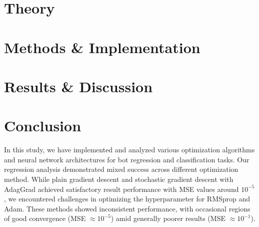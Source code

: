 \documentclass[aps,pra,english,notitlepage,reprint,nofootinbib]{revtex4-1}  %
\begin{document}



\section{Theory}\label{sec:theory}


\section{Methods \& Implementation}\label{sec:methods}


\section{Results \& Discussion}\label{sec:results discussion}


\section{Conclusion}\label{sec:conclusion}
In this study, we have implemented and analyzed various optimization algorithms and neural network architectures for bot regression and classification tasks. Our regression analysis demonstrated mixed success across different optimization method. While plain gradient descent and stochastic gradient descent with AdagGrad achieved satisfactory result performance with MSE values around $ 10^{-5} $, we encountered challenges in optimizing the hyperparameter for RMSprop and Adam. These methods showed inconsistent performance, with occasional regions of good convergence (MSE $\approx 10^{-5}$) amid generally poorer results (MSE $\approx 10^{-1}$). 
\end{document}
